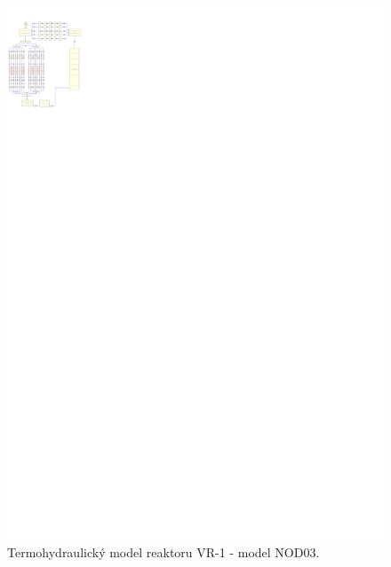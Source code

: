 \begin{figure}
	\centering
	\includegraphics[width=\textwidth, trim={0cm 218cm 148cm 5cm}, clip]{./07_prilohy/prehled_modelu/nod03.pdf}
	\caption{Termohydraulický model reaktoru VR-1 - model NOD03.}
	\label{fig:nod_03_prilohy}
\end{figure}
